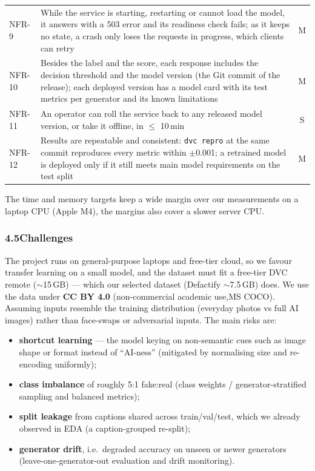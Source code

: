 \documentclass[11pt]{article}
\begin{document}
\begin{tabularx}{\textwidth}{@{}l Y c@{}}
NFR-9 & While the service is starting, restarting or cannot load the model, it answers with a 503 error and its readiness check fails; as it keeps no state, a crash only loses the requests in progress, which clients can retry & M \medskip \\
NFR-10 & Besides the label and the score, each response includes the decision threshold and the model version (the Git commit of the release); each deployed version has a model card with its test metrics per generator and its known limitations & M \medskip \\
NFR-11 & An operator can roll the service back to any released model version, or take it offline, in $\leq$ 10\,min & S \medskip \\
NFR-12 & Results are repeatable and consistent: \texttt{dvc repro} at the same commit reproduces every metric within $\pm$0.001; a retrained model is deployed only if it still meets main model requirements on the test split & M \\
\bottomrule
\end{tabularx}

\smallskip
\noindent The time and memory targets keep a wide margin over our measurements on a laptop CPU (Apple M4), the margins also cover a slower server CPU.

\subsubsection*{4.5\quad Challenges}
The project runs on general-purpose laptops and free-tier cloud, so we favour transfer learning on a small model, and the dataset must fit a free-tier DVC remote ($\sim$15\,GB) --- which our selected dataset (Defactify $\sim$7.5\,GB) does. We use the data under \textbf{CC BY 4.0} (non-commercial academic use,MS COCO). Assuming inputs resemble the training distribution (everyday photos vs full AI images) rather than face-swaps or adversarial inputs. The main risks are:


\medskip


\begin{itemize}[nosep,leftmargin=1.4em]
  \item \textbf{shortcut learning} --- the model keying on non-semantic cues such as image shape or format instead of ``AI-ness'' (mitigated by normalising size and re-encoding uniformly);
  \item \textbf{class imbalance} of roughly 5:1 fake:real (class weights / generator-stratified sampling and balanced metrics);
  \item \textbf{split leakage} from captions shared across train/val/test, which we already observed in EDA (a caption-grouped re-split);
  \item \textbf{generator drift}, i.e.\ degraded accuracy on unseen or newer generators (leave-one-generator-out evaluation and drift monitoring).
\end{itemize}
\end{document}
